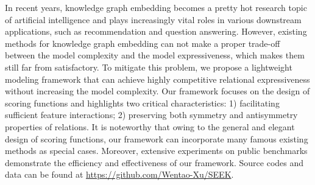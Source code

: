 In recent years, knowledge graph embedding becomes a pretty hot research topic of artificial intelligence and plays increasingly vital roles in various downstream applications, such as recommendation and question answering. However, existing methods for knowledge graph embedding can not make a proper trade-off between the model complexity and the model expressiveness, which makes them still far from satisfactory. To mitigate this problem, we propose a lightweight modeling framework that can achieve highly competitive relational expressiveness without increasing the model complexity. Our framework focuses on the design of scoring functions and highlights two critical characteristics: 1) facilitating sufficient feature interactions; 2) preserving both symmetry and antisymmetry properties of relations. It is noteworthy that owing to the general and elegant design of scoring functions, our framework can incorporate many famous existing methods as special cases. Moreover, extensive experiments on public benchmarks demonstrate the efficiency and effectiveness of our framework. Source codes and data can be found at \url{https://github.com/Wentao-Xu/SEEK}.
